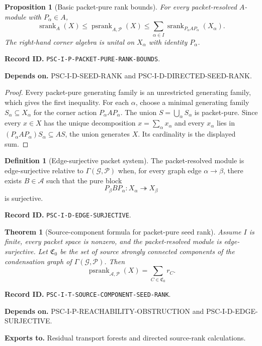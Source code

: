 \documentclass[11pt]{article}
\newtheorem{theorem}{Theorem}[section]
\newtheorem{proposition}[proposition]{Proposition}
\theoremstyle{definition}
\newtheorem{definition}[definition]{Definition}
\theoremstyle{remark}
\newcommand{\A}{\mathcal A}
\newcommand{\Pcal}{\mathcal P}
\newcommand{\srank}{\operatorname{srank}}
\newcommand{\psrank}{\operatorname{psrank}}
\newcommand{\RecordID}[1]{\par\smallskip\noindent\begingroup\footnotesize\color{PSCGray}\raggedright\textbf{Record ID.} \nolinkurl{#1}.\par\endgroup}
\newcommand{\Depends}[1]{\par\noindent\begingroup\footnotesize\color{PSCGray}\raggedright\textbf{Depends on.} #1\par\endgroup}
\newcommand{\Exports}[1]{\par\noindent\begingroup\footnotesize\color{PSCGray}\raggedright\textbf{Exports to.} #1\par\endgroup}
\begin{document}
\begin{proposition}[Basic packet-pure rank bounds]
\label{prop:packet-pure-rank-bounds}
For every packet-resolved $A$-module with $P_\alpha\in A$,
\[
\boxed{
\srank_A(X)
\leq
\psrank_{A,\Pcal}(X)
\leq
\sum_{\alpha\in I}
\srank_{P_\alpha A P_\alpha}(X_\alpha).
}
\]
The right-hand corner algebra is unital on $X_\alpha$ with identity $P_\alpha$.
\end{proposition}
\RecordID{PSC-I-P-PACKET-PURE-RANK-BOUNDS}
\Depends{PSC-I-D-SEED-RANK and PSC-I-D-DIRECTED-SEED-RANK.}

\begin{proof}
Every packet-pure generating family is an unrestricted generating family, which gives the first inequality.  For each $\alpha$, choose a minimal generating family $S_\alpha\subseteq X_\alpha$ for the corner action $P_\alpha A P_\alpha$.  The union $S=\bigcup_\alpha S_\alpha$ is packet-pure.  Since every $x\in X$ has the unique decomposition $x=\sum_\alpha x_\alpha$ and every $x_\alpha$ lies in $(P_\alpha A P_\alpha)S_\alpha\subseteq AS$, the union generates $X$.  Its cardinality is the displayed sum.
\end{proof}

\begin{definition}[Edge-surjective packet system]
\label{def:edge-surjective}
The packet-resolved module is edge-surjective relative to $\Gamma(\mathcal G,\Pcal)$ when, for every graph edge $\alpha\to\beta$, there exists $B\in\A$ such that the pure block
\[
P_\beta BP_\alpha:X_\alpha\twoheadrightarrow X_\beta
\]
is surjective.
\end{definition}
\RecordID{PSC-I-D-EDGE-SURJECTIVE}

\begin{theorem}[Source-component formula for packet-pure seed rank]
\label{thm:source-component-rank}
Assume $I$ is finite, every packet space is nonzero, and the packet-resolved module is edge-surjective.  Let $\mathfrak C_0$ be the set of source strongly connected components of the condensation graph of $\Gamma(\mathcal G,\Pcal)$.  Then
\[
\boxed{
\psrank_{\A,\Pcal}(X)
=
\sum_{C\in\mathfrak C_0}r_C.
}
\]
\end{theorem}
\RecordID{PSC-I-T-SOURCE-COMPONENT-SEED-RANK}
\Depends{PSC-I-P-REACHABILITY-OBSTRUCTION and PSC-I-D-EDGE-SURJECTIVE.}
\Exports{Residual transport forests and directed source-rank calculations.}
\end{document}
